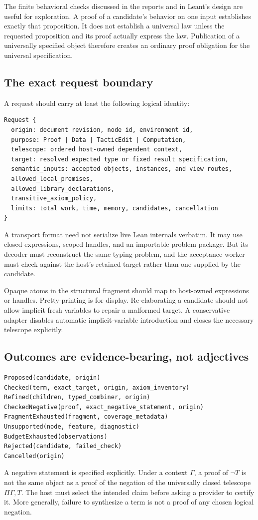 \documentclass[11pt,letterpaper]{article}
\theoremstyle{definition}
\theoremstyle{remark}
\begin{document}
The finite behavioral checks discussed in the reports and in Leant's design
are useful for exploration. A proof of a candidate's behavior on one input
establishes exactly that proposition. It does not establish a universal law
unless the requested proposition and its proof actually express the law.
Publication of a universally specified object therefore creates an ordinary
proof obligation for the universal specification.

\subsection{The exact request boundary}
A request should carry at least the following logical identity:
\begin{lstlisting}
Request {
  origin: document revision, node id, environment id,
  purpose: Proof | Data | TacticEdit | Computation,
  telescope: ordered host-owned dependent context,
  target: resolved expected type or fixed result specification,
  semantic_inputs: accepted objects, instances, and view routes,
  allowed_local_premises,
  allowed_library_declarations,
  transitive_axiom_policy,
  limits: total work, time, memory, candidates, cancellation
}
\end{lstlisting}
A transport format need not serialize live Lean internals verbatim. It may use
closed expressions, scoped handles, and an importable problem package. But
its decoder must reconstruct the same typing problem, and the acceptance
worker must check against the host's retained target rather than one supplied
by the candidate.

Opaque atoms in the structural fragment should map to host-owned expressions
or handles. Pretty-printing is for display. Re-elaborating a candidate should
not allow implicit fresh variables to repair a malformed target. A conservative
adapter disables automatic implicit-variable introduction and closes the
necessary telescope explicitly.

\subsection{Outcomes are evidence-bearing, not adjectives}
\begin{lstlisting}
Proposed(candidate, origin)
Checked(term, exact_target, origin, axiom_inventory)
Refined(children, typed_combiner, origin)
CheckedNegative(proof, exact_negative_statement, origin)
FragmentExhausted(fragment, coverage_metadata)
Unsupported(node, feature, diagnostic)
BudgetExhausted(observations)
Rejected(candidate, failed_check)
Cancelled(origin)
\end{lstlisting}
A negative statement is specified explicitly. Under a context $\Gamma$, a proof
of $\neg T$ is not the same object as a proof of the negation of the universally
closed telescope $\Pi\Gamma,T$. The host must select the intended claim before
asking a provider to certify it. More generally, failure to synthesize a term
is not a proof of any chosen logical negation.
\end{document}
